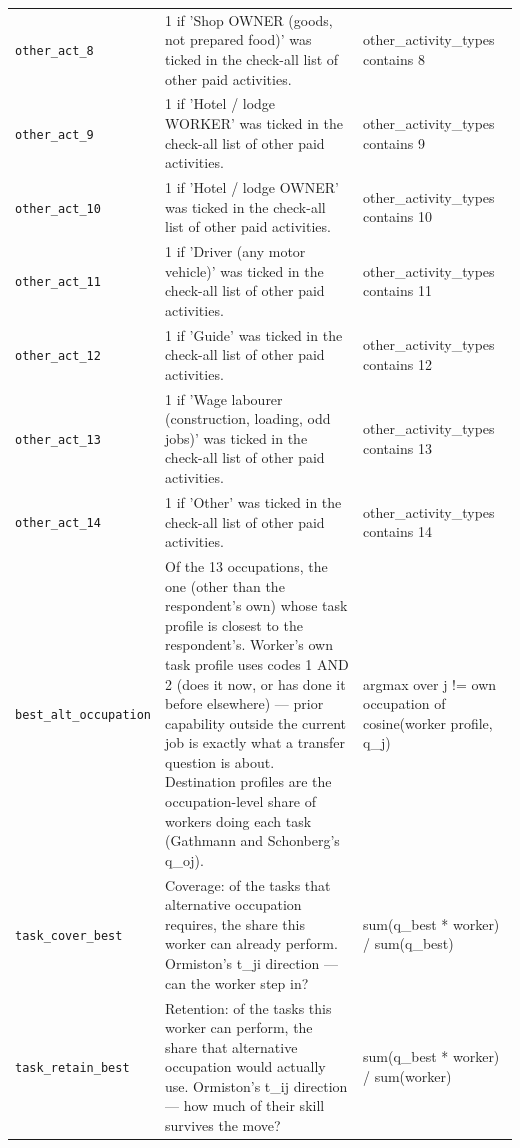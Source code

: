 \documentclass[10pt]{article}
\begin{document}
{\begin{longtable}{p{3.3cm}p{7.6cm}p{5.7cm}}
\texttt{other\_act\_8} & 1 if 'Shop OWNER (goods, not prepared food)' was ticked in the check-all list of other paid activities. & other\_activity\_types contains 8 \\
\texttt{other\_act\_9} & 1 if 'Hotel / lodge WORKER' was ticked in the check-all list of other paid activities. & other\_activity\_types contains 9 \\
\texttt{other\_act\_10} & 1 if 'Hotel / lodge OWNER' was ticked in the check-all list of other paid activities. & other\_activity\_types contains 10 \\
\texttt{other\_act\_11} & 1 if 'Driver (any motor vehicle)' was ticked in the check-all list of other paid activities. & other\_activity\_types contains 11 \\
\texttt{other\_act\_12} & 1 if 'Guide' was ticked in the check-all list of other paid activities. & other\_activity\_types contains 12 \\
\texttt{other\_act\_13} & 1 if 'Wage labourer (construction, loading, odd jobs)' was ticked in the check-all list of other paid activities. & other\_activity\_types contains 13 \\
\texttt{other\_act\_14} & 1 if 'Other' was ticked in the check-all list of other paid activities. & other\_activity\_types contains 14 \\
\texttt{best\_alt\_occupation} & Of the 13 occupations, the one (other than the respondent's own) whose task profile is closest to the respondent's. Worker's own task profile uses codes 1 AND 2 (does it now, or has done it before elsewhere) — prior capability outside the current job is exactly what a transfer question is about. Destination profiles are the occupation-level share of workers doing each task (Gathmann and Schonberg's q\_oj). & argmax over j != own occupation of cosine(worker profile, q\_j) \\
\texttt{task\_cover\_best} & Coverage: of the tasks that alternative occupation requires, the share this worker can already perform. Ormiston's t\_ji direction — can the worker step in? & sum(q\_best * worker) / sum(q\_best) \\
\texttt{task\_retain\_best} & Retention: of the tasks this worker can perform, the share that alternative occupation would actually use. Ormiston's t\_ij direction — how much of their skill survives the move? & sum(q\_best * worker) / sum(worker) \\

\end{longtable}}
\end{document}
